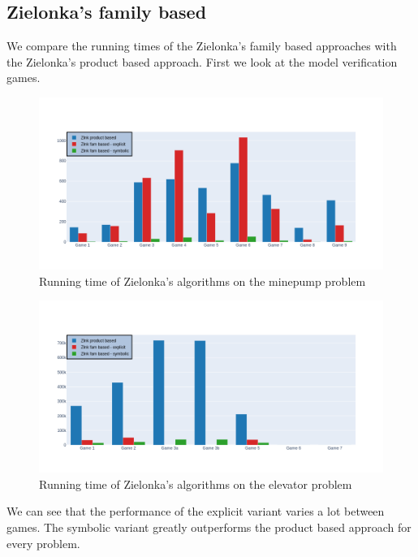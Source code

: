 \subsection{Zielonka's family based}
We compare the running times of the Zielonka's family based approaches with the Zielonka's product based approach. First we look at the model verification games.
\begin{figure}[H]
	\includegraphics[width=1\linewidth]{"results/minepump/Zlnk product based_Zlnk fam based - explicit_Zlnk fam based - symbolic_"}
	\caption{Running time of Zielonka's algorithms on the minepump problem}
	\label{fig:minepumpzlnks}
\end{figure}%
\begin{figure}[H]
	\includegraphics[width=1\linewidth]{"results/elevator/Zlnk product based_Zlnk fam based - explicit_Zlnk fam based - symbolic_"}
	\caption{Running time of Zielonka's algorithms on the elevator problem}
	\label{fig:elevatorzlnks}
\end{figure}%
We can see that the performance of the explicit variant varies a lot between games. The symbolic variant greatly outperforms the product based approach for every problem.

